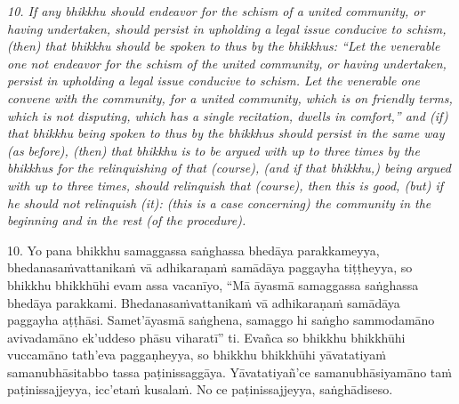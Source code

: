 \documentclass[11pt]{article}
\begin{document}
\begin{paracol}{2}
\begin{column}
{\itshape\footnotesize
10. If any bhikkhu should endeavor for the schism of a united community, or having undertaken, should persist in upholding a legal issue conducive to schism, (then) that bhikkhu should be spoken to thus by the bhikkhus: “Let the venerable one not endeavor for the schism of the united community, or having undertaken, persist in upholding a legal issue conducive to schism. Let the venerable one convene with the community, for a united community, which is on friendly terms, which is not disputing, which has a single recitation, dwells in comfort,” and (if) that bhikkhu being spoken to thus by the bhikkhus should persist in the same way (as before), (then) that bhikkhu is to be argued with up to three times by the bhikkhus for the relinquishing of that (course), (and if that bhikkhu,) being argued with up to three times, should relinquish that (course), then this is good, (but) if he should not relinquish (it): (this is a case concerning) the community in the beginning and in the rest (of the procedure).
}
\switchcolumn

\begin{flushleft}
10. Yo pana bhikkhu samaggassa saṅghassa bhedāya parakkameyya, bhedanasaṁvattanikaṁ vā adhikaraṇaṁ samādāya paggayha tiṭṭheyya, so bhikkhu bhikkhūhi evam assa vacanīyo, “Mā āyasmā samaggassa saṅghassa bhedāya parakkami. Bhedanasaṁvattanikaṁ vā adhikaraṇaṁ samādāya paggayha aṭṭhāsi. Samet’āyasmā saṅghena, samaggo hi saṅgho sammodamāno avivadamāno ek’uddeso phāsu viharatī” ti. Evañca so bhikkhu bhikkhūhi vuccamāno tath’eva paggaṇheyya, so bhikkhu bhikkhūhi yāvatatiyaṁ samanubhāsitabbo tassa paṭinissaggāya. Yāvatatiyañ’ce samanubhāsiyamāno taṁ paṭinissajjeyya, icc’etaṁ kusalaṁ. No ce paṭinissajjeyya, saṅghādiseso.
\switchcolumn*
\end{flushleft}


\end{column}
\end{paracol}
\end{document}
